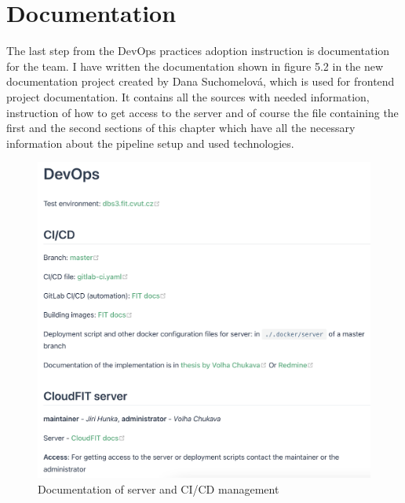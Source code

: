 \section{Documentation} The last step from the DevOps practices adoption instruction is documentation for the team. I have written the documentation shown in figure 5.2 in the new documentation project created by Dana Suchomelová, which is used for frontend project documentation. It contains all the sources with needed information, instruction of how to get access to the server and of course the file containing the first and the second sections of this chapter which have all the necessary information about the pipeline setup and used technologies. 

\begin{figure}[ht]
\centering
\includegraphics[scale=0.5]{../png/docs.png}
\caption{Documentation of server and CI/CD management}
\end{figure}
